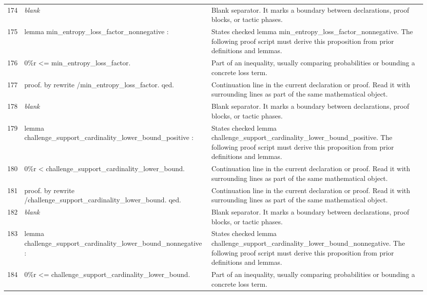 \documentclass[10pt]{article}
\begin{document}
\begin{longtable}{r L{0.53\textwidth} L{0.37\textwidth}}
174 & {\ttfamily\scriptsize \emph{blank}} & Blank separator.  It marks a boundary between declarations, proof blocks, or tactic phases. \\
175 & {\ttfamily\scriptsize lemma min\_entropy\_loss\_factor\_nonnegative :} & States checked lemma min\_entropy\_loss\_factor\_nonnegative.  The following proof script must derive this proposition from prior definitions and lemmas. \\
176 & {\ttfamily\scriptsize   0\%r <= min\_entropy\_loss\_factor.} & Part of an inequality, usually comparing probabilities or bounding a concrete loss term. \\
177 & {\ttfamily\scriptsize proof. by rewrite /min\_entropy\_loss\_factor. qed.} & Continuation line in the current declaration or proof.  Read it with surrounding lines as part of the same mathematical object. \\
178 & {\ttfamily\scriptsize \emph{blank}} & Blank separator.  It marks a boundary between declarations, proof blocks, or tactic phases. \\
179 & {\ttfamily\scriptsize lemma challenge\_support\_cardinality\_lower\_bound\_positive :} & States checked lemma challenge\_support\_cardinality\_lower\_bound\_positive.  The following proof script must derive this proposition from prior definitions and lemmas. \\
180 & {\ttfamily\scriptsize   0\%r < challenge\_support\_cardinality\_lower\_bound.} & Continuation line in the current declaration or proof.  Read it with surrounding lines as part of the same mathematical object. \\
181 & {\ttfamily\scriptsize proof. by rewrite /challenge\_support\_cardinality\_lower\_bound. qed.} & Continuation line in the current declaration or proof.  Read it with surrounding lines as part of the same mathematical object. \\
182 & {\ttfamily\scriptsize \emph{blank}} & Blank separator.  It marks a boundary between declarations, proof blocks, or tactic phases. \\
183 & {\ttfamily\scriptsize lemma challenge\_support\_cardinality\_lower\_bound\_nonnegative :} & States checked lemma challenge\_support\_cardinality\_lower\_bound\_nonnegative.  The following proof script must derive this proposition from prior definitions and lemmas. \\
184 & {\ttfamily\scriptsize   0\%r <= challenge\_support\_cardinality\_lower\_bound.} & Part of an inequality, usually comparing probabilities or bounding a concrete loss term. \\

\end{longtable}
\end{document}
